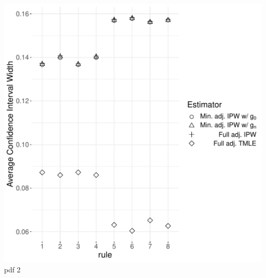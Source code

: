 \documentclass[11pt]{article}\usepackage[]{graphicx}\usepackage[]{color}
\makeatletter
\def\maxwidth{ %
  \ifdim\Gin@nat@width>\linewidth
    \linewidth
  \else
    \Gin@nat@width
  \fi
}
\makeatother
\begin{document}
\includegraphics[width=\maxwidth]{figure/unnamed-chunk-3-3} 
pdf 
  2 
\end{document}
